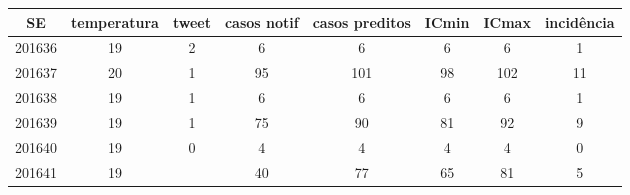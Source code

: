 \begin{tabular}{c|ccccccc}
  \hline
SE & temperatura & tweet & casos notif & casos preditos & ICmin & ICmax & incidência \\ 
  \hline
201636 & 19 & 2 & 6 & 6 & 6 & 6 & 1 \\ 
  201637 & 20 & 1 & 95 & 101 & 98 & 102 & 11 \\ 
  201638 & 19 & 1 & 6 & 6 & 6 & 6 & 1 \\ 
  201639 & 19 & 1 & 75 & 90 & 81 & 92 & 9 \\ 
  201640 & 19 & 0 & 4 & 4 & 4 & 4 & 0 \\ 
  201641 & 19 &  & 40 & 77 & 65 & 81 & 5 \\ 
   \hline
\end{tabular}
